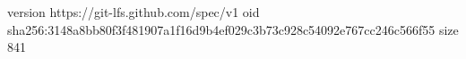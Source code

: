 version https://git-lfs.github.com/spec/v1
oid sha256:3148a8bb80f3f481907a1f16d9b4ef029c3b73c928c54092e767cc246c566f55
size 841
